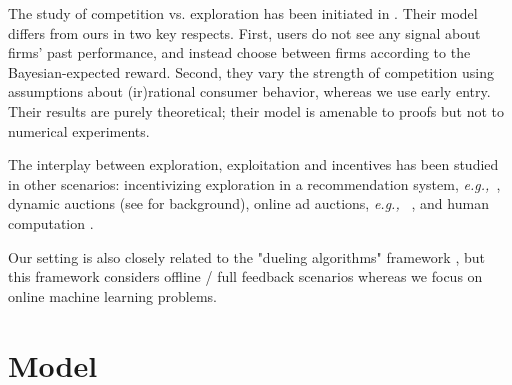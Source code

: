 \documentclass[letterpaper]{article}
\theoremstyle{definition}
\newcommand{\OMIT}[1]{}
\newcommand{\eg}{{\em e.g.,~\xspace}}
\begin{document}
The study of competition vs. exploration has been initiated in \cite{CompetingBandits-itcs16}. Their model differs from ours in two key respects. First, users do not see any signal about firms' past performance, and instead choose between firms according to the Bayesian-expected reward. Second, they vary the strength of competition using assumptions about (ir)rational consumer behavior, whereas we use early entry. Their results are purely theoretical; their model is amenable to proofs but not to numerical experiments.

The interplay between exploration, exploitation and incentives has been studied in other scenarios: incentivizing exploration in a recommendation system,
    \eg \cite{Kremer-JPE14,Frazier-ec14,Che-13,ICexploration-ec15,Bimpikis-exploration-ms17},
dynamic auctions
    (see \cite{DynAuctions-survey10} for background),
online ad auctions, \eg
    \cite{MechMAB-ec09,DevanurK09,NSV08,Transform-ec10-jacm,Amin-auctions-nips13},
and human computation
    \cite{RepeatedPA-ec14,Ghosh-itcs13,Krause-www13}.

\OMIT{ %
The interplay between exploration, exploitation, and incentives has been studied in several other settings, the most relevant to this paper being \cite{che2017recommender}, \cite{kremer2014implementing}, \cite{mansour2015bayesian}. The strategic experimentation literature in economics, such as \cite{bolton1999strategic} and \cite{keller2005strategic}, studies models with self-interested agents jointly performing exploration whereas in this paper the firms cannot observe the actions or the payoffs of the other firms and exploration is coordinated by the consumers.
} %

Our setting is also closely related to the "dueling algorithms" framework \cite{DuelingAlgs-stoc11}, but this framework considers offline / full feedback scenarios whereas we focus on online machine learning problems.


\section{Model}\label{sec:model}
\end{document}
